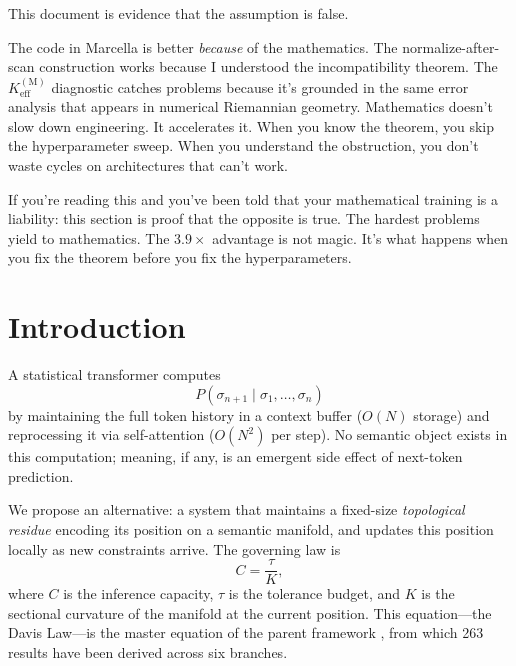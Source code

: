 \documentclass[11pt,a4paper]{article}
\theoremstyle{definition}
\theoremstyle{remark}
\begin{document}
This document is evidence that the assumption is false.

The code in Marcella is better \emph{because} of the mathematics. 
The normalize-after-scan construction works because I understood the 
incompatibility theorem. The $K_{\mathrm{eff}}^{(\mathrm{M})}$ 
diagnostic catches problems because it's grounded in the same error 
analysis that appears in numerical Riemannian geometry. Mathematics 
doesn't slow down engineering. It accelerates it. When you know the 
theorem, you skip the hyperparameter sweep. When you understand the 
obstruction, you don't waste cycles on architectures that can't work.

If you're reading this and you've been told that your mathematical 
training is a liability: this section is proof that the opposite is 
true. The hardest problems yield to mathematics. The $3.9\times$ 
advantage is not magic. It's what happens when you fix the theorem 
before you fix the hyperparameters.

\bigskip

\section{Introduction}\label{sec:intro}

A statistical transformer computes
\begin{equation}\label{eq:transformer}
    P(\sigma_{n+1} \mid \sigma_1, \ldots, \sigma_n)
\end{equation}
by maintaining the full token history in a context buffer ($O(N)$ 
storage) and reprocessing it via self-attention ($O(N^2)$ per step). 
No semantic object exists in this computation; meaning, if any, is 
an emergent side effect of next-token prediction.

We propose an alternative: a system that maintains a fixed-size 
\emph{topological residue} encoding its position on a semantic 
manifold, and updates this position locally as new constraints arrive. 
The governing law is
\begin{equation}\label{eq:davis_law}
    C = \frac{\tau}{K},
\end{equation}
where $C$ is the inference capacity, $\tau$ is the tolerance budget, 
and $K$ is the sectional curvature of the manifold at the current 
position. This equation---the Davis Law---is the master equation of 
the parent framework \cite{davis2026field}, from which 263 results 
have been derived across six branches.
\end{document}
